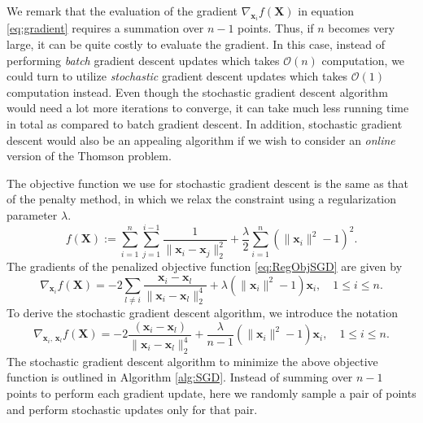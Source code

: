 \documentclass[11pt]{article}
\begin{document}
We remark that the evaluation of the gradient $\nabla_{\bm{x}_i}f(\bm{X})$ in equation \eqref{eq:gradient} requires a summation over $n-1$ points. Thus, if $n$ becomes very large, it can be quite costly to evaluate the gradient. In this case, instead of performing \emph{batch} gradient descent updates which takes $\mathcal{O}(n)$ computation, we could turn to utilize \emph{stochastic} gradient descent updates which takes $\mathcal{O}(1)$ computation instead. Even though the stochastic gradient descent algorithm would need a lot more iterations to converge, it can take much less running time in total as compared to batch gradient descent. In addition, stochastic gradient descent would also be an appealing algorithm if we wish to consider an \emph{online} version of the Thomson problem.

The objective function we use for stochastic gradient descent is the same as that of the penalty method, in which we relax the constraint using a regularization parameter $\lambda$.
\begin{equation}\label{eq:RegObjSGD}
f(\bm{X}) := \sum_{i=1}^n\sum_{j=1}^{i-1}\frac{1}{\|\bm{x}_i-\bm{x}_j\|_2^2} + \frac{\lambda}{2} \sum_{i=1}^n \left(\|\bm{x}_i\|^2-1\right)^2.
\end{equation}
The gradients of the penalized objective function \eqref{eq:RegObjSGD} are given by
\begin{equation}\label{eq:gradient}
\nabla_{\bm{x}_i} f(\bm{X}) = -2\sum_{l\neq i} \frac{\bm{x}_i-\bm{x}_l}{\|\bm{x}_i-\bm{x}_l\|_2^4} + \lambda\left(\|\bm{x}_i\|^2-1\right)\bm{x}_i, \quad 1\le i\le n.
\end{equation}
To derive the stochastic gradient descent algorithm, we introduce the notation
\begin{equation}\label{eq:gradient}
\nabla_{\bm{x}_i,\,\bm{x}_l} f(\bm{X}) = -2\frac{(\bm{x}_i-\bm{x}_l)}{\|\bm{x}_i-\bm{x}_l\|_2^4} + \frac{\lambda}{n-1}\left(\|\bm{x}_i\|^2-1\right)\bm{x}_i, \quad 1\le i\le n.
\end{equation}	
The stochastic gradient descent algorithm to minimize the above objective function is outlined in Algorithm \ref{alg:SGD}. Instead of summing over $n-1$ points to perform each gradient update, here we randomly sample a pair of points and perform stochastic updates only for that pair.
\end{document}
